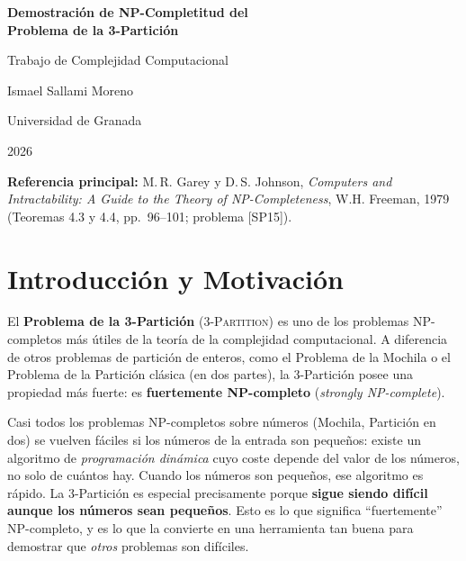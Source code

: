 \documentclass[12pt,a4paper]{article}
\theoremstyle{definition}
\theoremstyle{remark}
\newcommand{\TPART}{\textsc{3-Partition}}
\begin{document}

\begin{titlepage}
  \centering
  \vspace*{2cm}
  {\LARGE\bfseries Demostración de NP-Completitud del\\[0.5em]
  Problema de la 3-Partición\par}
  \vspace{1.5cm}
  {\large Trabajo de Complejidad Computacional\par}
  \vspace{0.5cm}
  {\large Ismael Sallami Moreno\par}
  \vspace{0.5cm}
  {\large Universidad de Granada\par}
  \vspace{2cm}
  {\normalsize 2026\par}
  \vfill
  \begin{tcolorbox}[colback=gray!10, colframe=gray!50, width=0.85\textwidth]
  \small\centering
  \textbf{Referencia principal:} M.\,R. Garey y D.\,S. Johnson,
  \textit{Computers and Intractability: A Guide to the Theory of NP-Completeness},
  W.H. Freeman, 1979 (Teoremas 4.3 y 4.4, pp.~96--101; problema [SP15]).
  \end{tcolorbox}
\end{titlepage}

\tableofcontents
\newpage

\section{Introducción y Motivación}

El \textbf{Problema de la 3-Partición} (\TPART) es uno de los problemas
NP-completos más útiles de la teoría de la complejidad computacional.
A diferencia de otros problemas de partición de enteros, como el Problema de la
Mochila o el Problema de la Partición clásica (en dos partes), la 3-Partición
posee una propiedad más fuerte: es \textbf{fuertemente NP-completo}
(\emph{strongly NP-complete}).

\begin{intuicion}
Casi todos los problemas NP-completos sobre números (Mochila, Partición en dos)
se vuelven fáciles si los números de la entrada son pequeños: existe un algoritmo
de \emph{programación dinámica} cuyo coste depende del valor de los números, no
solo de cuántos hay. Cuando los números son pequeños, ese algoritmo es rápido.
La 3-Partición es especial precisamente porque \textbf{sigue siendo difícil
aunque los números sean pequeños}. Esto es lo que significa ``fuertemente''
NP-completo, y es lo que la convierte en una herramienta tan buena para demostrar
que \emph{otros} problemas son difíciles.
\end{intuicion}
\end{document}
